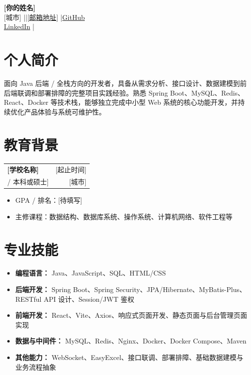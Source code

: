 \documentclass[11pt,a4paper]{ctexart}
\newcommand{\resumeSubheading}[4]{
  \begin{tabularx}{\textwidth}{Xr}
    \textbf{#1} & #2 \\
    #3 & #4 \\
  \end{tabularx}
}
\begin{document}
\begin{center}
    {\textbf{[你的姓名]}} \\
    \vspace{4pt}
    [城市] \quad|\quad [手机号] \quad|\quad \href{mailto:[邮箱地址]}{[邮箱地址]} \quad|\quad \href{https://github.com/[github用户名]}{GitHub} \\
    \vspace{2pt}
    \href{https://www.linkedin.com/in/[linkedin用户名]}{LinkedIn} \quad|\quad [个人主页 / 博客，可选]
\end{center}

\section*{个人简介}
面向 Java 后端 / 全栈方向的开发者，具备从需求分析、接口设计、数据建模到前后端联调和部署排障的完整项目实践经验。熟悉 Spring Boot、MySQL、Redis、React、Docker 等技术栈，能够独立完成中小型 Web 系统的核心功能开发，并持续优化产品体验与系统可维护性。

\section*{教育背景}
\resumeSubheading
  {[学校名称]}{[起止时间]}
  {[专业名称] / 本科或硕士]}{[城市]}
\begin{itemize}
  \item GPA / 排名：[待填写]
  \item 主修课程：数据结构、数据库系统、操作系统、计算机网络、软件工程等
\end{itemize}

\section*{专业技能}
\begin{itemize}
  \item \textbf{编程语言：} Java、JavaScript、SQL、HTML/CSS
  \item \textbf{后端开发：} Spring Boot、Spring Security、JPA/Hibernate、MyBatis-Plus、RESTful API 设计、Session/JWT 鉴权
  \item \textbf{前端开发：} React、Vite、Axios、响应式页面开发、静态页面与后台管理页面实现
  \item \textbf{数据与中间件：} MySQL、Redis、Nginx、Docker、Docker Compose、Maven
  \item \textbf{其他能力：} WebSocket、EasyExcel、接口联调、部署排障、基础数据建模与业务流程抽象
\end{itemize}
\end{document}
